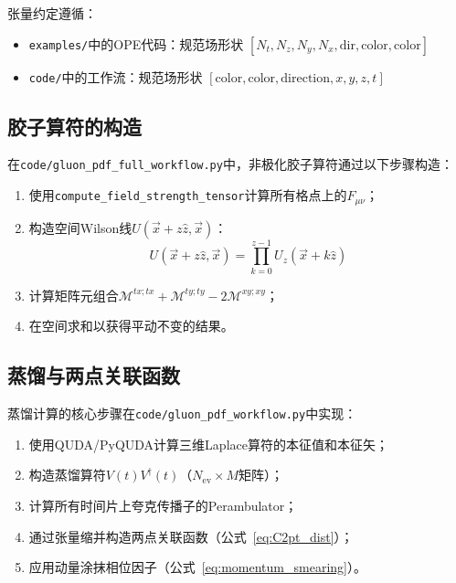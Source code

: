 \documentclass[12pt,a4paper]{ctexart}
\theoremstyle{definition}
\begin{document}
张量约定遵循：
\begin{itemize}
    \item \texttt{examples/}中的OPE代码：规范场形状 $[N_t, N_z, N_y, N_x, \text{dir}, \text{color}, \text{color}]$
    \item \texttt{code/}中的工作流：规范场形状 $[\text{color}, \text{color}, \text{direction}, x, y, z, t]$
\end{itemize}

\subsection{胶子算符的构造}

在\texttt{code/gluon\_pdf\_full\_workflow.py}中，非极化胶子算符通过以下步骤构造：

\begin{enumerate}
    \item 使用\texttt{compute\_field\_strength\_tensor}计算所有格点上的$F_{\mu\nu}$；
    \item 构造空间Wilson线$U(\vec{x}+z\hat{z}, \vec{x})$：
    \begin{equation}
        U(\vec{x}+z\hat{z}, \vec{x}) = \prod_{k=0}^{z-1} U_z(\vec{x}+k\hat{z})
    \end{equation}
    \item 计算矩阵元组合$\mathcal{M}^{tx;tx} + \mathcal{M}^{ty;ty} - 2\mathcal{M}^{xy;xy}$；
    \item 在空间求和以获得平动不变的结果。
\end{enumerate}

\subsection{蒸馏与两点关联函数}

蒸馏计算的核心步骤在\texttt{code/gluon\_pdf\_workflow.py}中实现：

\begin{enumerate}
    \item 使用QUDA/PyQUDA计算三维Laplace算符的本征值和本征矢；
    \item 构造蒸馏算符$V(t) V^\dagger(t)$（$N_{\text{ev}} \times M$矩阵）；
    \item 计算所有时间片上夸克传播子的Perambulator；
    \item 通过张量缩并构造两点关联函数（公式~\ref{eq:C2pt_dist}）；
    \item 应用动量涂抹相位因子（公式~\ref{eq:momentum_smearing}）。
\end{enumerate}
\end{document}
